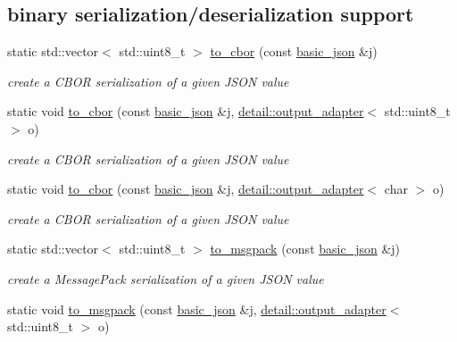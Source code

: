 \subsection*{binary serialization/deserialization support}
\begin{DoxyCompactItemize}
\item 
static std\+::vector$<$ std\+::uint8\+\_\+t $>$ \hyperlink{classnlohmann_1_1basic__json_a7ddb186b25dd9b1da672a3d5f3defbf9}{to\+\_\+cbor} (const \hyperlink{classnlohmann_1_1basic__json}{basic\+\_\+json} \&j)
\begin{DoxyCompactList}\small\item\em create a C\+B\+OR serialization of a given J\+S\+ON value \end{DoxyCompactList}\item 
static void \hyperlink{classnlohmann_1_1basic__json_ac59dfbee523c5340e41548764a8d26be}{to\+\_\+cbor} (const \hyperlink{classnlohmann_1_1basic__json}{basic\+\_\+json} \&j, \hyperlink{classnlohmann_1_1detail_1_1output__adapter}{detail\+::output\+\_\+adapter}$<$ std\+::uint8\+\_\+t $>$ o)
\begin{DoxyCompactList}\small\item\em create a C\+B\+OR serialization of a given J\+S\+ON value \end{DoxyCompactList}\item 
static void \hyperlink{classnlohmann_1_1basic__json_a5689672954fd3bc38f2f17e5607064c6}{to\+\_\+cbor} (const \hyperlink{classnlohmann_1_1basic__json}{basic\+\_\+json} \&j, \hyperlink{classnlohmann_1_1detail_1_1output__adapter}{detail\+::output\+\_\+adapter}$<$ char $>$ o)
\begin{DoxyCompactList}\small\item\em create a C\+B\+OR serialization of a given J\+S\+ON value \end{DoxyCompactList}\item 
static std\+::vector$<$ std\+::uint8\+\_\+t $>$ \hyperlink{classnlohmann_1_1basic__json_ae4cb21fa2c0b24c494077f5e173c43e3}{to\+\_\+msgpack} (const \hyperlink{classnlohmann_1_1basic__json}{basic\+\_\+json} \&j)
\begin{DoxyCompactList}\small\item\em create a Message\+Pack serialization of a given J\+S\+ON value \end{DoxyCompactList}\item 
static void \hyperlink{classnlohmann_1_1basic__json_af57f7877fbef9881289fe2c8b31e37e1}{to\+\_\+msgpack} (const \hyperlink{classnlohmann_1_1basic__json}{basic\+\_\+json} \&j, \hyperlink{classnlohmann_1_1detail_1_1output__adapter}{detail\+::output\+\_\+adapter}$<$ std\+::uint8\+\_\+t $>$ o)

\end{DoxyCompactItemize}
